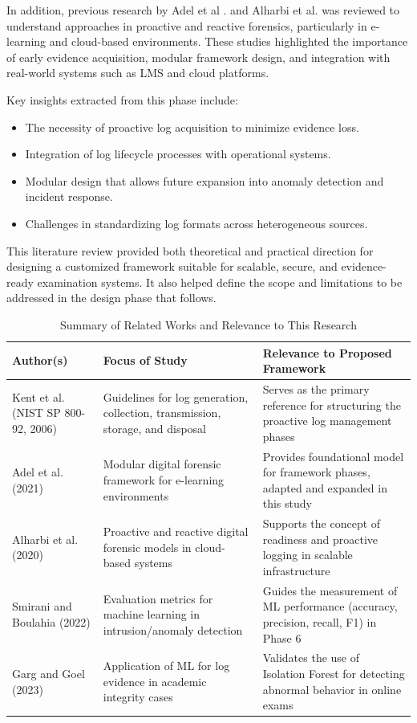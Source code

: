 In addition, previous research by Adel et al \cite{adel2024ethicore}. and Alharbi et al\cite{proactiveandreactivedigitalforensics}. was reviewed to understand approaches in proactive and reactive forensics, particularly in e-learning and cloud-based environments. These studies highlighted the importance of early evidence acquisition, modular framework design, and integration with real-world systems such as LMS and cloud platforms.

Key insights extracted from this phase include:

\begin{itemize}
	\item The necessity of proactive log acquisition to minimize evidence loss.
	\item Integration of log lifecycle processes with operational systems.
	\item Modular design that allows future expansion into anomaly detection and incident response.
	\item Challenges in standardizing log formats across heterogeneous sources.
\end{itemize}

This literature review provided both theoretical and practical direction for designing a customized framework suitable for scalable, secure, and evidence-ready examination systems. It also helped define the scope and limitations to be addressed in the design phase that follows.
\begin{table}[H]
	\centering
	\caption{Summary of Related Works and Relevance to This Research}
	\label{tab:literature_review}
	\begin{tabular}{|p{3.5cm}|p{4.5cm}|p{4.5cm}|}
		\hline
		\textbf{Author(s)} & \textbf{Focus of Study} & \textbf{Relevance to Proposed Framework} \\
		\hline
		Kent et al. (NIST SP 800-92, 2006) \cite{kentnist800922006guide} & Guidelines for log generation, collection, transmission, storage, and disposal & Serves as the primary reference for structuring the proactive log management phases \\
		\hline
		Adel et al. (2021) \cite{adel2024ethicore} & Modular digital forensic framework for e-learning environments & Provides foundational model for framework phases, adapted and expanded in this study \\
		\hline
		Alharbi et al. (2020) \cite{proactiveandreactivedigitalforensics} & Proactive and reactive digital forensic models in cloud-based systems & Supports the concept of readiness and proactive logging in scalable infrastructure \\
		\hline
		Smirani and Boulahia (2022) \cite{smirani2022algorithm} & Evaluation metrics for machine learning in intrusion/anomaly detection & Guides the measurement of ML performance (accuracy, precision, recall, F1) in Phase 6 \\
		\hline
		Garg and Goel (2023) \citet{garg2023preserving} & Application of ML for log evidence in academic integrity cases & Validates the use of Isolation Forest for detecting abnormal behavior in online exams \\
		\hline
	\end{tabular}
\end{table}


